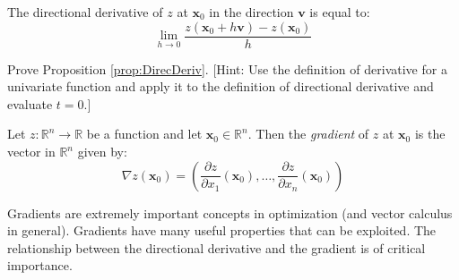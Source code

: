 \begin{proposition} The directional derivative of $z$ at $\mathbf{x}_0$ in the direction $\mathbf{v}$ is equal to:
\begin{equation}
\lim_{h \rightarrow 0}\frac{z(\mathbf{x}_0 + h\mathbf{v}) - z(\mathbf{x}_0)}{h}
\end{equation}
\label{prop:DirecDeriv}
\end{proposition}

\begin{exercise} Prove Proposition \ref{prop:DirecDeriv}. [Hint: Use the definition of derivative for a univariate function and apply it to the definition of directional derivative and evaluate $t=0$.]
\end{exercise}

\begin{definition}[Gradient]
Let $z:\mathbb{R}^n \rightarrow \mathbb{R}$ be a function and let $\mathbf{x}_0 \in \mathbb{R}^n$. Then the \textit{gradient} of $z$ at $\mathbf{x}_0$ is the vector in $\mathbb{R}^n$ given by:
\begin{equation}
\nabla z(\mathbf{x}_0) = \left(\frac{\partial z}{\partial x_1}(\mathbf{x}_0),\dots, \frac{\partial z}{\partial x_n}(\mathbf{x}_0)\right)
\end{equation}
\label{def:Gradient}
\end{definition}

Gradients are extremely important concepts in optimization (and vector calculus in general). Gradients have many useful properties that can be exploited. The relationship between the directional derivative and the gradient is of critical importance.


